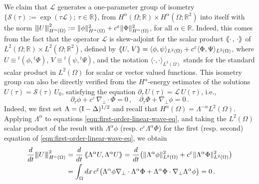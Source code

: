 \documentclass[11pt,reqno]{amsart}
\def \R{{\mathbb{R}}}
\newcommand{\vertiii}[1]{{\left\vert\kern-0.25ex\left\vert\kern-0.25ex\left\vert #1 \right\vert\kern-0.25ex\right\vert\kern-0.25ex\right\vert}}
\newcommand{\dsp}[2]{\left\langle\hspace{-#1pt}\left\langle#2\right\rangle\hspace{-#1pt}\right\rangle}
\begin{document}
We claim that $\mathcal L$ generates a one-parameter group of isometry $\{ \mathcal{S}(\tau):=\exp(\tau \mathcal L);\, \tau \in \R \}$, from $H^\alpha(\Omega;\R) \times H^\alpha(\Omega;\R^2)$ into itself with the norm $\vertiii{ U }_{H^\alpha(\Omega)}^2 := \|\phi \|_{H^\alpha(\Omega)}^2 +c^\varepsilon\| \Phi \|_{H^\alpha(\Omega)}^2$, for all $\alpha\in \R$. Indeed, this comes from the fact that the operator $\mathcal L$ is skew-adjoint for the scalar product $ \dsp{2.5}{ \cdot\, , \, \cdot  }$ of $L^2(\Omega;\R) \times L^2(\Omega;\R^2)$, defined by $ \dsp{2.5}{ U, \, V  } =\langle \phi, \psi\rangle_{L^2(\Omega)} + c^\varepsilon \langle \Phi,\Psi \rangle_{L^2(\Omega)}$, where $U\equiv {}^t(\phi,{}^t\Phi)$, $V\equiv {}^t(\psi,{}^t\Psi)$, and the notation $\langle \cdot, \cdot\rangle_{L^2(\Omega)}$ stands for the standard scalar product in $L^2(\Omega)$ for scalar or vector valued functions. This isometry group can also be directly verified from the $H^\alpha$-energy estimates of the solutions $U(\tau) = \mathcal{S}(\tau)\, U_0$, satisfying the equation $\partial_\tau \,U(\tau)=   \mathcal L \, U(\tau) $, i.e.,
\begin{equation}
\label{eqn:first-order-linear-wave-eq}
\partial_\tau \phi + c^\varepsilon \,\nabla_\perp\cdot \Phi = 0\,, \quad
\partial_\tau \Phi + \nabla_\perp \phi = 0\,.
\end{equation}
Indeed, we first set $\Lambda = ({\rm I}-\Delta)^{1/2}$ and recall that $H^\alpha (\Omega) = \Lambda^{-\alpha} L^2(\Omega)$. Applying $\Lambda^{\alpha}$ to equations \eqref{eqn:first-order-linear-wave-eq}, and taking the $L^2(\Omega)$ scalar product of the result with $\Lambda^{\alpha}\phi$ (resp.  $c^\varepsilon \Lambda^{\alpha}\Phi$) for the first (resp. second) equation of \eqref{eqn:first-order-linear-wave-eq}, we obtain
\begin{align*}
  \frac{d}{dt} \vertiii{ U }_{H^\alpha(\Omega)}^2 & =  \frac{d}{dt}  \dsp{2.5}{\Lambda^{\alpha} U , \Lambda^{\alpha} U}= \frac{d}{dt}\big(\|\Lambda^{\alpha}\phi\|_{L^2(\Omega)}^2
  + c^\varepsilon\|\Lambda^{\alpha}\Phi\|_{L^2(\Omega)}^2 \big) \\
  &= \int_\Omega dx\, c^\varepsilon 
  \big(
  \Lambda^{\alpha}\phi \nabla_\perp\cdot \Lambda^{\alpha}\Phi + \Lambda^{\alpha}\Phi\cdot  \nabla_\perp\Lambda^{\alpha}\phi 
  \big)=0\,.
\end{align*}
\end{document}
